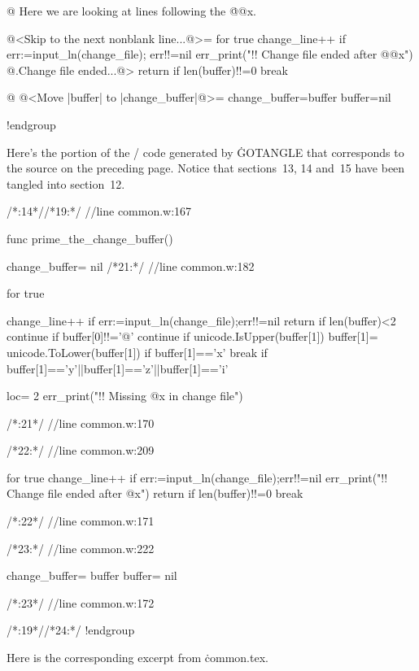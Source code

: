 @ Here we are looking at lines following the \.{@@x}.

@<Skip to the next nonblank line...@>=
for true {
        change_line++
        if err:=input_ln(change_file); err!!=nil {
                err_print("!! Change file ended after @@x")
                @.Change file ended...@>
                return
        }
        if len(buffer)!!=0 {
                break
        }
}

@ @<Move |buffer| to |change_buffer|@>=
{
        change_buffer=buffer
        buffer=nil
}

!endgroup
\endgroup
\vfill\eject

\def\runninghead{APPENDIX A  --- TRANSLATION BY {\tentt GOTANGLE}}

Here's the portion of the \GO/ code generated by \.{GOTANGLE} that corresponds
to the source on the preceding page.  Notice that sections~13, 14 and~15
have been tangled into section~12.

\vskip6pt
\begingroup \def\tt{\eighttt} \baselineskip9pt
\verbatim

/*:14*//*19:*/
//line common.w:167

func prime_the_change_buffer(){
change_buffer= nil
/*21:*/
//line common.w:182

for true{
change_line++
if err:=input_ln(change_file);err!!=nil{
return
}
if len(buffer)<2{
continue
}
if buffer[0]!!='@'{
continue
}
if unicode.IsUpper(buffer[1]){
buffer[1]= unicode.ToLower(buffer[1])
}
if buffer[1]=='x'{
break
}
if buffer[1]=='y'||buffer[1]=='z'||buffer[1]=='i'{
loc= 2
err_print("!! Missing @x in change file")

}
}

/*:21*/
//line common.w:170

/*22:*/
//line common.w:209

for true{
change_line++
if err:=input_ln(change_file);err!!=nil{
err_print("!! Change file ended after @x")
return
}
if len(buffer)!!=0{
break
}
}

/*:22*/
//line common.w:171

/*23:*/
//line common.w:222

{
change_buffer= buffer
buffer= nil
}

/*:23*/
//line common.w:172

}

/*:19*//*24:*/
!endgroup
\endgroup
\vfill\eject

\def\runninghead{APPENDIX A --- TRANSLATION BY {\tentt GOWEAVE}}

Here is the corresponding excerpt from \.{common.tex}.

